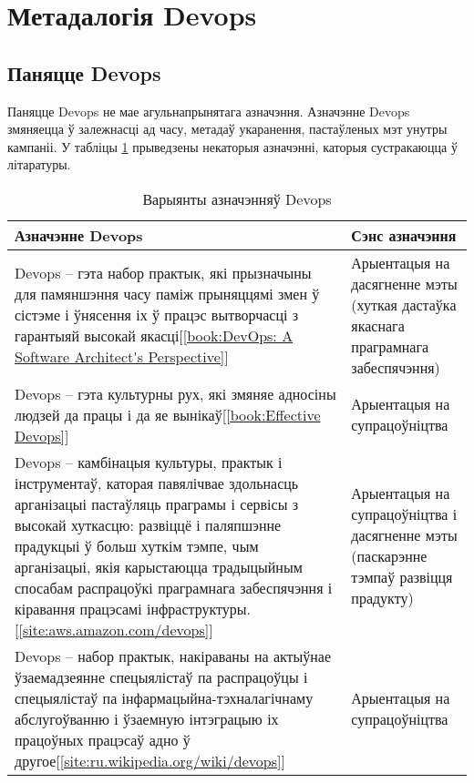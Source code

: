 \section{Метадалогія Devops}

\subsection{Паняцце Devops}

Паняцце Devops не мае агульнапрынятага азначэння.
Азначэнне Devops змяняецца ў залежнасці ад часу, метадаў укаранення,
пастаўленых мэт унутры кампаніі.
У табліцы \ref{table:Definition of Devops} прыведзены некаторыя
азначэнні, каторыя сустракаюцца ў літаратуры.

\begin{table}[htbp]
    \caption{Варыянты азначэнняў Devops}
    \begin{tabular}{|p{}|p{}|} 
        \hline
        \textbf{Азначэнне Devops}
        &
        \textbf{Сэнс азначэння}  \\ 
        \hline
        Devops -- гэта набор практык, які прызначыны для
        памяншэння часу паміж прыняццямі змен ў сістэме і
        ўнясення іх ў працэс вытворчасці з гарантыяй
        высокай якасці[\ref{book:DevOps: A Software Architect's Perspective}]
        &
        Арыентацыя на дасягненне мэты (хуткая дастаўка
        якаснага праграмнага забеспячэння) \\ 
        \hline
        Devops -- гэта культурны рух, які змяняе адносіны людзей
        да працы і да яе вынікаў[\ref{book:Effective Devops}]
        & Арыентацыя на супрацоўніцтва \\ 
        \hline
        Devops -- камбінацыя культуры, практык і інструментаў,
        каторая павялічвае здольнасць арганізацыі
        пастаўляць праграмы і сервісы
        з высокай хуткасцю: развіццё і паляпшэнне прадукцыі
        ў больш хуткім тэмпе,
        чым арганізацыі, якія карыстаюцца традыцыйным спосабам распрацоўкі
        праграмнага забеспячэння і
        кіравання працэсамі інфраструктуры.[\ref{site:aws.amazon.com/devops}]
        & Арыентацыя на супрацоўніцтва і дасягненне мэты
        (паскарэнне тэмпаў развіцця прадукту) \\
        \hline
        Devops -- набор практык, накіраваны на актыўнае ўзаемадзеянне
        спецыялістаў па распрацоўцы і
        спецыялістаў па інфармацыйна-тэхналагічнаму
        абслугоўванню і ўзаемную інтэграцыю
        іх працоўных працэсаў
        адно ў другое[\ref{site:ru.wikipedia.org/wiki/devops}]
        &
        Арыентацыя на супрацоўніцтва \\
        \hline
    \end{tabular}
    \label{table:Definition of Devops}
\end{table}

